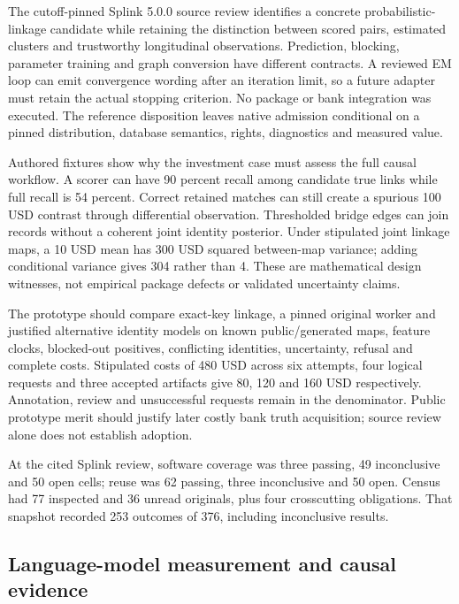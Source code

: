 The cutoff-pinned Splink 5.0.0 source review identifies a concrete
probabilistic-linkage candidate while retaining the distinction between
scored pairs, estimated clusters and trustworthy longitudinal
observations. Prediction, blocking, parameter training and graph
conversion have different contracts. A reviewed EM loop can emit
convergence wording after an iteration limit, so a future adapter must
retain the actual stopping criterion. No package or bank integration was
executed. The reference disposition leaves native admission conditional
on a pinned distribution, database semantics, rights, diagnostics and
measured value. \citep{exec24_splink_sources,exec24_splink_contract}

Authored fixtures show why the investment case must assess the full
causal workflow. A scorer can have 90 percent recall among candidate
true links while full recall is 54 percent. Correct retained matches can
still create a spurious 100 USD contrast through differential
observation. Thresholded bridge edges can join records without a
coherent joint identity posterior. Under stipulated joint linkage maps,
a 10 USD mean has 300 USD squared between-map variance; adding
conditional variance gives 304 rather than 4. These are mathematical
design witnesses, not empirical package defects or validated uncertainty
claims. \citep{exec24_splink_contract}

The prototype should compare exact-key linkage, a pinned original worker
and justified alternative identity models on known public/generated
maps, feature clocks, blocked-out positives, conflicting identities,
uncertainty, refusal and complete costs. Stipulated costs of 480 USD
across six attempts, four logical requests and three accepted artifacts
give 80, 120 and 160 USD respectively. Annotation, review and
unsuccessful requests remain in the denominator. Public prototype merit
should justify later costly bank truth acquisition; source review alone
does not establish adoption. \citep{exec24_splink_contract}

At the cited Splink review, software coverage was three passing, 49
inconclusive and 50 open cells; reuse was 62 passing, three inconclusive
and 50 open. Census had 77 inspected and 36 unread originals, plus four
crosscutting obligations. That snapshot recorded 253 outcomes of 376,
including inconclusive results.
\citep{sp24splink_reader,sp24splink_progress}

\hypertarget{language-model-measurement-and-causal-evidence}{%
\subsection{Language-model measurement and causal
evidence}\label{language-model-measurement-and-causal-evidence}}

